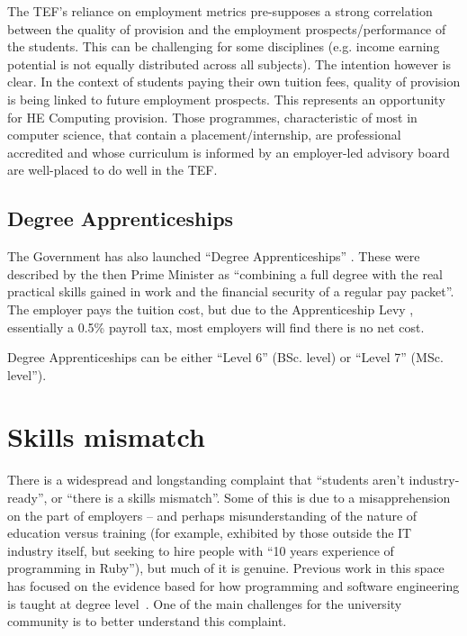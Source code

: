 \documentclass[sigconf,anonymous]{acmart}
\begin{document}
The TEF's reliance on employment metrics pre-supposes a strong correlation between the quality of provision and the employment prospects/performance of the students. This can be challenging for some disciplines (e.g. income earning potential is not equally distributed across all subjects). The intention however is clear. In the context of students paying their own tuition fees, quality of provision is being linked to future employment prospects. This represents an opportunity for HE Computing provision. Those programmes, characteristic of most in computer science,  that contain a placement/internship, are professional accredited and whose curriculum is informed by an employer-led advisory board are well-placed to do well in the TEF. 

\subsection{Degree Apprenticeships}\label{sec:DA}

The Government has also launched ``Degree Apprenticeships''
\cite{BIS2015a}. These were described by the then Prime Minister as
``combining a full degree with the real practical skills gained in
work and the financial security of a regular pay packet''. The
employer pays the tuition cost, but due to the Apprenticeship Levy
\cite{HMRC2016a}, essentially a 0.5\% payroll tax, most employers will find there is no net cost.

Degree Apprenticeships can be either ``Level 6'' (BSc. level) or ``Level 7'' (MSc. level'').

\section{Skills mismatch}\label{sec:Skills}

There is a widespread and longstanding complaint that ``students
aren't industry-ready'', or ``there is a skills mismatch''. Some of
this is due to a misapprehension on the part of employers -- and
perhaps misunderstanding of the nature of education versus training
(for example, exhibited by those outside the IT industry itself, but
seeking to hire people with ``10 years experience of programming in
Ruby''), but much of it is genuine. Previous work in this space has
focused on the evidence based for how programming and software
engineering is taught at degree
level~\cite{davenport-et-al:latice2016,murphy-et-al:programming2017,simon-et-al:sigcse2018}. One
of the main challenges for the university community is to better
understand this complaint.
\end{document}
